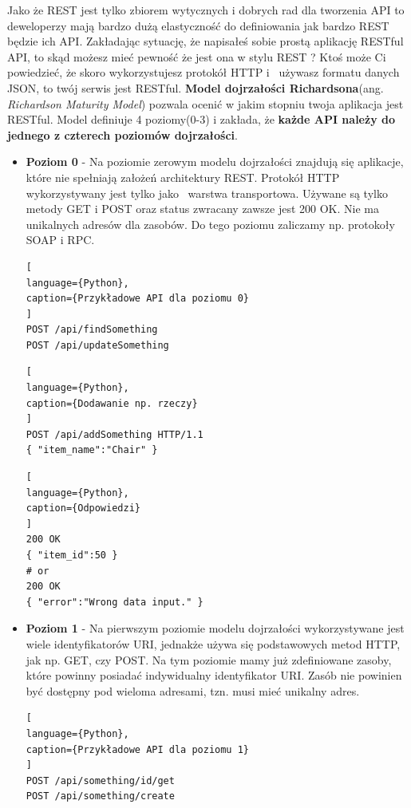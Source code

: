 \documentclass[oneside,polski,logo,indent]{amuthesis}
\begin{document}
Jako że REST jest tylko zbiorem wytycznych i dobrych rad dla tworzenia API to deweloperzy mają bardzo dużą elastyczność do definiowania jak bardzo REST będzie ich API. Zakładając sytuację, że napisałeś sobie prostą aplikację RESTful API, to skąd możesz mieć pewność że jest ona w stylu REST ? Ktoś może Ci powiedzieć, że skoro wykorzystujesz protokół HTTP i~ używasz formatu danych JSON, to twój serwis jest RESTful. \textbf{Model dojrzałości Richardsona}(ang. \emph{Richardson Maturity Model}) pozwala ocenić w jakim stopniu twoja aplikacja jest RESTful. Model definiuje 4 poziomy(0-3) i zakłada, że \textbf{każde API należy do jednego z czterech poziomów dojrzałości}.

\begin{itemize}
\item \textbf{Poziom 0} - Na poziomie zerowym modelu dojrzałości znajdują się aplikacje, które nie spełniają założeń architektury REST. Protokół HTTP wykorzystywany jest tylko jako~ warstwa transportowa. Używane są tylko metody GET i POST oraz status zwracany zawsze jest 200 OK. Nie ma unikalnych adresów dla zasobów. Do tego poziomu zaliczamy np. protokoły SOAP i RPC.

\begin{lstlisting}[
language={Python},
caption={Przykładowe API dla poziomu 0}
]
POST /api/findSomething
POST /api/updateSomething
\end{lstlisting}

\begin{lstlisting}[
language={Python},
caption={Dodawanie np. rzeczy}
]
POST /api/addSomething HTTP/1.1
{ "item_name":"Chair" }
\end{lstlisting}

\begin{lstlisting}[
language={Python},
caption={Odpowiedzi}
]
200 OK
{ "item_id":50 }
# or
200 OK
{ "error":"Wrong data input." }
\end{lstlisting}

\item \textbf{Poziom 1} - Na pierwszym poziomie modelu dojrzałości wykorzystywane jest wiele identyfikatorów URI, jednakże używa się podstawowych metod HTTP, jak np. GET, czy POST. Na tym poziomie mamy już zdefiniowane zasoby, które powinny posiadać indywidualny identyfikator URI. Zasób nie powinien być dostępny pod wieloma adresami, tzn. musi mieć unikalny adres.

\begin{lstlisting}[
language={Python},
caption={Przykładowe API dla poziomu 1}
]
POST /api/something/id/get
POST /api/something/create
\end{lstlisting}


\end{itemize}
\end{document}
